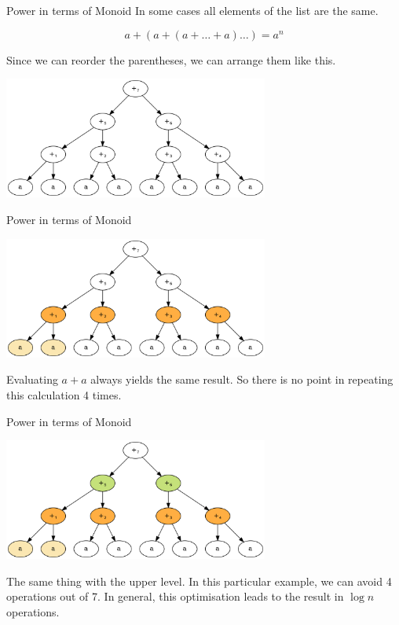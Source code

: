 \documentclass[presentation,aspectratio=169,smaller]{beamer}
\begin{document}
\begin{frame}[label={sec:org923b3e7}]{Power in terms of Monoid}
In some cases all elements of the list are the same.

\pause
\begin{equation*}
  a + (a + (a + \ldots + a) \ldots ) = a ^ n
\end{equation*}

\pause

Since we can reorder the parentheses, we can arrange them like this.

\pause

\begin{center}
\includegraphics[height=4cm]{.dot/fold-power-1.png}
\end{center}
\end{frame}

\begin{frame}[label={sec:orgeb7465f}]{Power in terms of Monoid}
\begin{center}
\includegraphics[height=4cm]{.dot/fold-power-2.png}
\end{center}

Evaluating \(a + a\) always yields the same result. So there is no point in
repeating this calculation 4 times.
\end{frame}

\begin{frame}[label={sec:org0746872}]{Power in terms of Monoid}
\begin{center}
\includegraphics[height=4cm]{.dot/fold-power-3.png}
\end{center}

The same thing with the upper level. In this particular example, we can avoid 4
operations out of 7. In general, this optimisation leads to the result in \(\log
n\) operations.
\end{frame}
\end{document}
